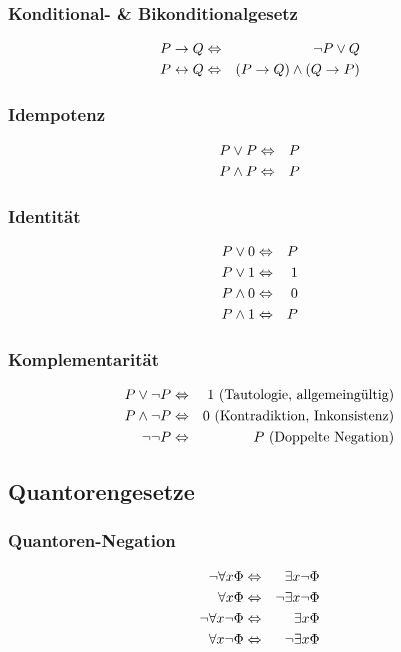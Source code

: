 \documentclass[a4paper,twoside,DIV15,BCOR12mm]{scrbook}
\begin{document}
\subsubsection{Konditional- \& Bikonditionalgesetz}
\begin{eqnarray*}
	P \rightarrow Q & \Leftrightarrow & \neg P \vee Q\\
	P \leftrightarrow Q  & \Leftrightarrow & (P \rightarrow Q) \wedge (Q \rightarrow P)
\end{eqnarray*}

\subsubsection{Idempotenz}
\begin{eqnarray*}
	P \vee P   & \Leftrightarrow & P \\
	P \wedge P & \Leftrightarrow & P
\end{eqnarray*}

\subsubsection{Identität}
\begin{eqnarray*}
	P \vee 0   & \Leftrightarrow & P \\
	P \vee 1   & \Leftrightarrow & 1 \\
	P \wedge 0 & \Leftrightarrow & 0 \\
	P \wedge 1 & \Leftrightarrow & P
\end{eqnarray*}

\subsubsection{Komplementarität}
\begin{eqnarray*}
	P \vee \neg P   & \Leftrightarrow & 1\ \text{(Tautologie, allgemeingültig)} \\
	P \wedge \neg P & \Leftrightarrow & 0\ \text{(Kontradiktion, Inkonsistenz)} \\
	\neg\neg P      & \Leftrightarrow & P\ \text{(Doppelte Negation)} 
\end{eqnarray*}

\subsection{Quantorengesetze}
\subsubsection{Quantoren-Negation}
\begin{eqnarray*}
	\neg \forall x \Phi      & \Leftrightarrow & \exists x \neg \Phi \\
	\forall x \Phi           & \Leftrightarrow & \neg \exists x \neg \Phi \\
	\neg \forall x \neg \Phi & \Leftrightarrow & \exists x \Phi \\
	\forall x \neg \Phi      & \Leftrightarrow & \neg \exists x \Phi
\end{eqnarray*}
\end{document}
